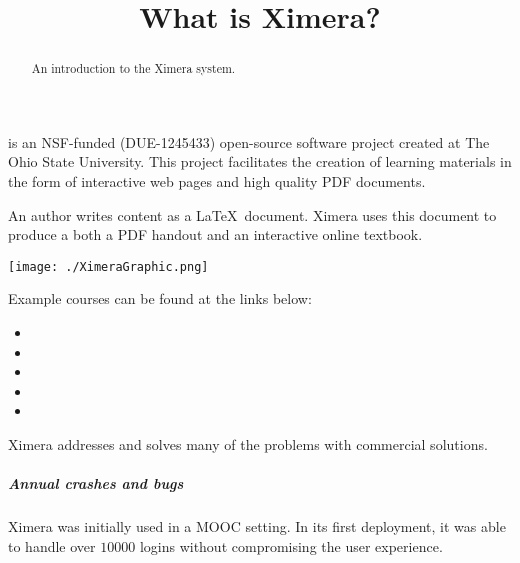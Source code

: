 \documentclass{ximera}
\title{What is Ximera?}
\begin{document}
\begin{abstract}
An introduction to the Ximera system.
\end{abstract}
\maketitle

 is an NSF-funded (DUE-1245433)
open-source software project created at The Ohio State
University. This project facilitates the creation of learning
materials in the form of interactive web pages and high quality PDF
documents.

An author writes content as a \LaTeX\ document.  Ximera uses this
document to produce a both a PDF handout and an interactive online
textbook.

\begin{image}
\texttt{[image: ./XimeraGraphic.png]}
\end{image}


Example courses can be found at the links below:

\begin{itemize}
\item {}
\item {}
\item {}
\item {}
\item {}
\end{itemize}

\newpage


Ximera addresses and solves many of the problems with commercial
solutions.

\subparagraph{Annual crashes and bugs}

Ximera was initially used in a MOOC setting. In its first deployment,
it was able to handle over $10000$ logins without compromising the
user experience.
\end{document}

